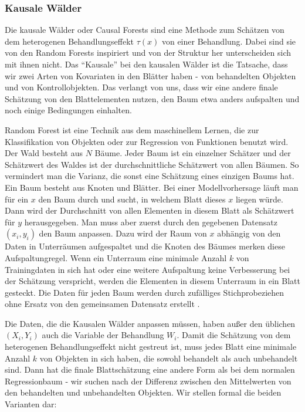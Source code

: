 \documentclass[12pt,a4paper,twoside]{scrartcl}
\numberwithin{equation}{section}
\begin{document}
\subsubsection{Kausale Wälder}\label{subsubsec:kausaleWälder}
Die kausale Wälder oder Causal Forests sind eine Methode zum Schätzen von dem heterogenen Behandlungseffekt $\tau(x)$ von einer Behandlung. Dabei sind sie von den Random Forests inspiriert und von der Struktur her unterscheiden sich mit ihnen nicht. Das \enquote{Kausale} bei den kausalen Wälder ist die Tatsache, dass wir zwei Arten von Kovariaten in den Blätter haben - von behandelten Objekten und von Kontrollobjekten. Das verlangt von uns, dass wir eine andere finale Schätzung von den Blattelementen nutzen, den Baum etwa anders aufspalten und noch einige Bedingungen einhalten\cite{wager2018estimation}. \par

\noindent
Random Forest ist eine Technik aus dem maschinellem Lernen, die zur Klassifikation von Objekten oder zur Regression von Funktionen benutzt wird. Der Wald besteht aus $N$ Bäume. Jeder Baum ist ein einzelner Schätzer und der Schätzwert des Waldes ist der durchschnittliche Schätzwert von allen Bäumen. So vermindert man die Varianz, die sonst eine Schätzung eines einzigen Baums hat. Ein Baum besteht aus Knoten und Blätter. Bei einer Modellvorhersage läuft man für ein $x$ den Baum durch und sucht, in welchem Blatt dieses $x$ liegen würde. Dann wird der Durchschnitt von allen Elementen in diesem Blatt als Schätzwert für $y$ herausgegeben. Man muss aber zuerst durch den gegebenen Datensatz $(x_i,y_i)$ den Baum anpassen. Dazu wird der Raum von $x$ abhängig von den Daten in Unterräumen aufgespaltet und die Knoten des Bäumes merken diese Aufspaltungregel. Wenn ein Unterraum eine minimale Anzahl $k$ von Trainingdaten in sich hat oder eine weitere Aufspaltung keine Verbesserung bei der Schätzung verspricht, werden die Elementen in diesem Unterraum in ein Blatt gesteckt. Die Daten für jeden Baum werden durch zufälliges Stichprobeziehen ohne Ersatz von den gemeinsamen Datensatz erstellt \cite{breiman2001random}.\par

\noindent
Die Daten, die die Kausalen Wälder anpassen müssen, haben außer den üblichen $(X_i,Y_i)$ auch die Variable der Behandlung $W_i$. Damit die Schätzung von dem heterogenen Behandlungseffekt nicht gestreut ist, muss jedes Blatt eine minimale Anzahl $k$ von Objekten in sich haben, die sowohl behandelt als auch unbehandelt sind. Dann hat die finale Blattschätzung eine andere Form als bei dem normalen Regressionbaum - wir suchen nach der Differenz zwischen den Mittelwerten von den behandelten und unbehandelten Objekten\cite{wager2018estimation}. Wir stellen formal die beiden Varianten dar: \par 
\end{document}
